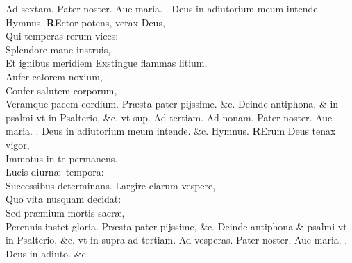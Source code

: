 \documentclass[a5paper,10pt]{book}
\def\ae{æ}
\begin{document}
\begin{multicols*}{2}
\newline {} \color{red} Ad \hypertarget{DOM-PRIMA-ADV-SEX}{sextam.} \color{black}
Pater noster. Aue maria. \color{red} \Vbar . \color{black} Deus in adiutorium meum intende. \quad \color{red} Hymnus. \color{black}
\vspace{-.25em}
\lettrine[lines=2]{\bfseries \color{red} R}{}Ector potens, verax Deus,\\Qui temperas rerum vices:\\Splendore mane instruis,\\Et ignibus meridiem
\newline \color{red} E\color{black}xstingue flammas litium,\\Aufer calorem noxium,\\Confer salutem corporum,\\Veramque pacem cordium.
\newline \color{red} P\color{black}r\ae sta pater pijssime. \&c.
\newline {} \color{red} Deinde antiphona, \& in psalmi vt in Psalterio, \&c. vt sup. Ad tertiam.
\newline {} \color{red} Ad \hypertarget{DOM-PRIMA-ADV-NON}{nonam.} \color{black}
Pater noster. Aue maria. \color{red} \Vbar . \color{black} Deus in adiutorium meum intende. \&c. \quad \color{red} Hymnus. \color{black}
\vspace{-.25em}
\lettrine[lines=2]{\bfseries \color{red} R}{}Erum Deus tenax vigor,\\Immotus in te permanens.\\Lucis diurn\ae \ tempora:\\Successibus determinans.
\newline \color{red} L\color{black}argire clarum vespere,\\Quo vita nusquam decidat:\\Sed pr\ae mium mortis sacr\ae ,\\Perennis instet gloria.
\newline \color{red} P\color{black}r\ae sta pater pijssime, \&c.
\newline \color{red} Deinde antiphona \& psalmi vt in Psalterio, \&c. vt in supra ad tertiam. \color{black}
\newline {} \color{red} Ad \hypertarget{DOM-PRIMA-ADV-VES}{vesperas.} \color{black}
Pater noster. Aue maria. \color{red} \Vbar . \color{black} Deus in adiuto. \&c. \color{black}

\end{multicols*}
\end{document}

